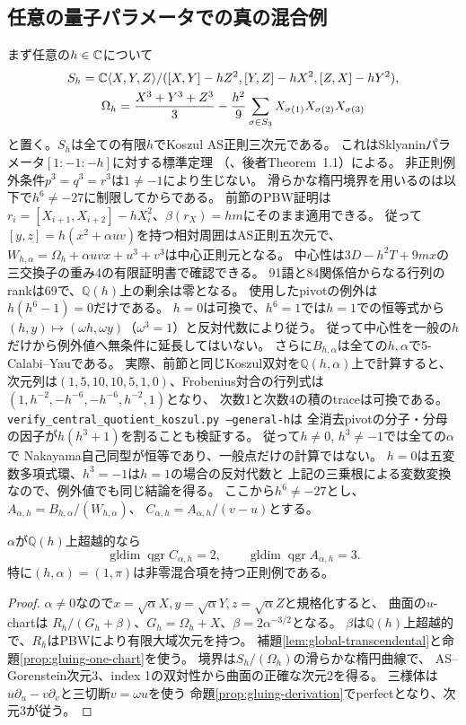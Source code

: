 \subsection{任意の量子パラメータでの真の混合例}
まず任意の$h\in\mathbb C$について
\begin{gather*}
 S_h=\mathbb C\langle X,Y,Z\rangle/
 ([X,Y]-hZ^2,[Y,Z]-hX^2,[Z,X]-hY^2),\\
 \Omega_h=\frac{X^3+Y^3+Z^3}{3}
 -\frac{h^2}{9}\sum_{\sigma\in S_3}X_{\sigma(1)}X_{\sigma(2)}X_{\sigma(3)}
\end{gather*}
と置く。$S_h$は全ての有限$h$でKoszul AS正則三次元である。
これはSklyaninパラメータ$[1:-1:-h]$に対する標準定理
（\cite{ATVRegular,ISSklyanin}、後者Theorem~1.1）による。
非正則例外条件$p^3=q^3=r^3$は$1\ne-1$により生じない。
滑らかな楕円境界を用いるのは以下で$h^6\ne-27$に制限してからである。
前節のPBW証明は$r_i=[X_{i+1},X_{i+2}]-hX_i^2$、$\beta(r_X)=h m$にそのまま適用できる。
従って$[y,z]=h(x^2+\alpha uv)$を持つ相対周囲はAS正則五次元で、
$W_{h,\alpha}=\Omega_h+\alpha uvx+u^3+v^3$は中心正則元となる。
中心性は$3D-h^2T+9mx$の三交換子の重み4の有限証明書で確認できる。
91語と84関係倍からなる行列のrankは69で、$\mathbb Q(h)$上の剰余は零となる。
使用したpivotの例外は$h(h^6-1)=0$だけである。
$h=0$は可換で、$h^6=1$では$h=1$での恒等式から
$(h,y)\mapsto(\omega h,\omega y)$（$\omega^3=1$）と反対代数により従う。
従って中心性を一般の$h$だけから例外値へ無条件に延長してはいない。
さらに$B_{h,\alpha}$は全ての$h,\alpha$で5-Calabi--Yauである。
実際、前節と同じKoszul双対を$\mathbb Q(h,\alpha)$上で計算すると、
次元列は$(1,5,10,10,5,1,0)$、Frobenius対合の行列式は
$(1,h^{-2},-h^{-6},-h^{-6},h^{-2},1)$となり、
次数1と次数4の積のtraceは可換である。
\texttt{verify\_central\_quotient\_koszul.py --general-h}は
全消去pivotの分子・分母の因子が$h(h^3+1)$を割ることも検証する。
従って$h\ne0$, $h^3\ne-1$では全ての$\alpha$で
Nakayama自己同型が恒等であり、一般点だけの計算ではない。
$h=0$は五変数多項式環、$h^3=-1$は$h=1$の場合の反対代数と
上記の三乗根による変数変換なので、例外値でも同じ結論を得る。
ここから$h^6\ne-27$とし、
$A_{\alpha,h}=B_{h,\alpha}/(W_{h,\alpha})$、
$C_{\alpha,h}=A_{\alpha,h}/(v-u)$とする。

\begin{corollary}[超越的な混合係数の具体例]
$\alpha$が$\mathbb Q(h)$上超越的なら
\[
 \operatorname{gldim}\operatorname{qgr}C_{\alpha,h}=2,\qquad
 \operatorname{gldim}\operatorname{qgr}A_{\alpha,h}=3.
\]
特に$(h,\alpha)=(1,\pi)$は非零混合項を持つ正則例である。
\end{corollary}
\begin{proof}
$\alpha\ne0$なので$x=\sqrt\alpha X,y=\sqrt\alpha Y,z=\sqrt\alpha Z$と規格化すると、
曲面の$u$-chartは
$R_h/(G_h+\beta)$、$G_h=\Omega_h+X$、$\beta=2\alpha^{-3/2}$となる。
$\beta$は$\mathbb Q(h)$上超越的で、$R_h$はPBWにより有限大域次元を持つ。
補題\ref{lem:global-transcendental}と命題\ref{prop:gluing-one-chart}を使う。
境界は$S_h/(\Omega_h)$の滑らかな楕円曲線で、
AS--Gorenstein次元3、index 1の双対性から曲面の正確な次元2を得る。
三様体は$u\partial_u-v\partial_v$と三切断$v=\omega u$を使う
命題\ref{prop:gluing-derivation}でperfectとなり、次元3が従う。
\end{proof}

